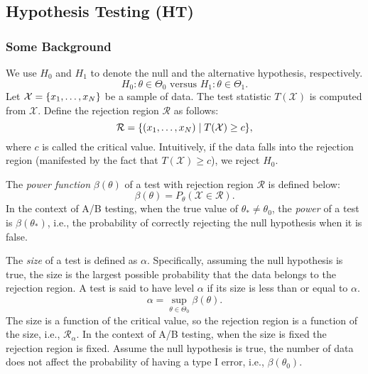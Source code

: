 \subsection{Hypothesis Testing (HT)}
    \subsubsection{Some Background}
        We use $H_0$ and $H_1$ to denote the null and the alternative hypothesis, respectively.
            \begin{equation}
                H_0: \theta \in  \Theta_0 \text{ versus } H_1: \theta \in \Theta_1. 
            \end{equation}
        Let $\mathcal{X} = \{ x_1, \ldots, x_N \}$  be a sample of data.
        The test statistic $T(\mathcal{X})$ is computed from $\mathcal{X}$.
        Define the rejection region $\mathcal{R}$ as follows:
            \begin{equation}
                \mathcal{R}  = \{ (x_1, \ldots, x_N) \mid T(\mathcal{X}) \ge c \},
            \end{equation}
        where $c$ is called the critical value.
        Intuitively, if the data falls into the rejection region (manifested by the fact that $T(\mathcal{X}) \ge c$), we reject $H_0$.

        The \emph{power function} $\beta(\theta)$ of a test with rejection region $\mathcal{R}$ is defined below:
            \begin{equation}
                \beta(\theta) = P_\theta(\mathcal{X} \in \mathcal{R}).
            \end{equation}
        In the context of A/B testing, when the true value of $\theta_\ast \ne \theta_0$, the \emph{power} of a test is $\beta(\theta_\ast)$, i.e., the probability of correctly rejecting the null hypothesis when it is false.
        
        The \emph{size}  of a test is defined as $\alpha$. 
        Specifically, assuming the null hypothesis is true, the size is the largest possible probability that the data belongs to the rejection region.  
        A test is said to have level $\alpha$ if its size is less than or equal to $\alpha$.
            \begin{equation}
                \alpha  = \sup_{\theta \in \Theta_0} \beta(\theta).
            \end{equation}
        The size is a function of the critical value, so the rejection region is a function of the size, i.e., $\mathcal{R}_\alpha$.
        In the context of A/B testing, when the size is fixed the rejection region is fixed. Assume the null hypothesis is true, the number of data does not affect the probability of having a type I error, i.e., $\beta(\theta_0)$.

